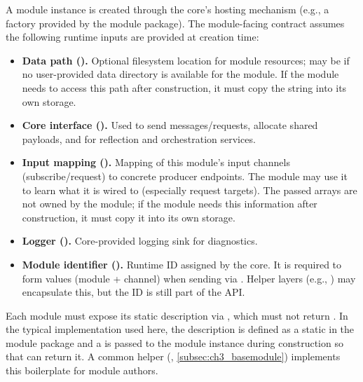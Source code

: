 A module instance is created through the core's hosting mechanism (e.g., a factory provided by the module package). The module-facing contract assumes the following runtime inputs are provided at creation time:
\begin{itemize}
    \item \textbf{Data path ().} Optional filesystem location for module resources; may be  if no user-provided data directory is available for the module. If the module needs to access this path after construction, it must copy the string into its own storage.
    \item \textbf{Core interface ().} Used to send messages/requests, allocate shared payloads, and for reflection and orchestration services.
    \item \textbf{Input mapping ().} Mapping of this module's input channels (subscribe/request) to concrete producer endpoints. The module may use it to learn what it is wired to (especially request targets). The passed arrays are not owned by the module; if the module needs this information after construction, it must copy it into its own storage.
    \item \textbf{Logger ().} Core-provided logging sink for diagnostics.
    \item \textbf{Module identifier ().} Runtime ID assigned by the core. It is required to form  values (module + channel) when sending via . Helper layers (e.g., ) may encapsulate this, but the ID is still part of the API.
\end{itemize}
Each module must expose its static description via , which must not return . In the typical implementation used here, the description is defined as a static  in the module package and a  is passed to the module instance during construction so that  can return it. A common helper (, \autoref{subsec:ch3_basemodule}) implements this boilerplate for module authors.

